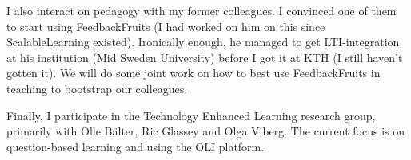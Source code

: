 I also interact on pedagogy with my former colleagues.
I convinced one of them to start using FeedbackFruits (I had worked on him on 
this since ScalableLearning existed).
Ironically enough, he managed to get LTI-integration at his institution (Mid 
Sweden University) before I got it at KTH (I still haven't gotten it).
We will do some joint work on how to best use FeedbackFruits in teaching to 
bootstrap our colleagues.

Finally, I participate in the Technology Enhanced Learning research group, 
primarily with Olle Bälter, Ric Glassey and Olga Viberg.
The current focus is on question-based learning and using the OLI platform.

